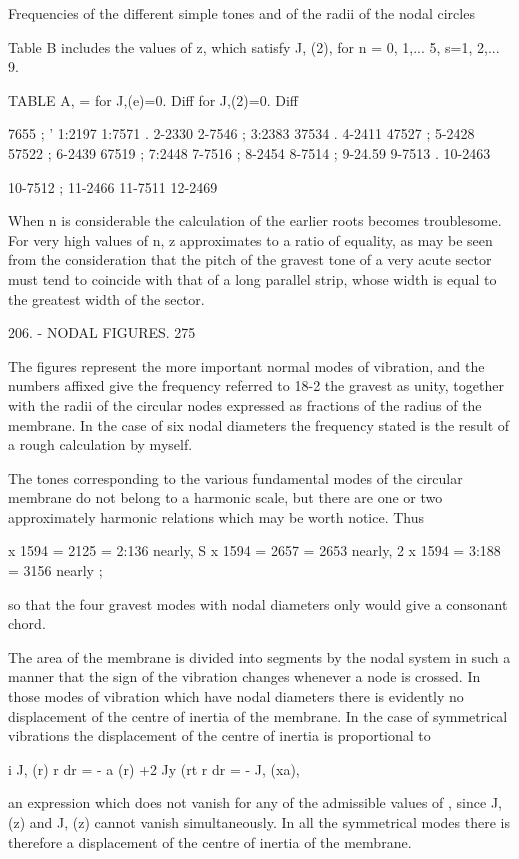 Frequencies of the different simple tones and of the radii of the nodal circles


Table B includes the values of z, which satisfy J, (2), for n =
0, 1,... 5, s=1, 2,... 9.


TABLE A, = for J,(e)=0. Diff for J,(2)=0. Diff

7655 ; ' 1:2197 1:7571 . 2-2330 2-7546 ; 3:2383 37534 . 4-2411 47527 ;
5-2428 57522 ; 6-2439 67519 ; 7:2448 7-7516 ; 8-2454 8-7514 ; 9-24.59
9-7513 . 10-2463

10-7512 ; 11-2466 11-7511 12-2469

When n is considerable the calculation of the earlier roots becomes
troublesome. For very high values of n, z approximates to a ratio of
equality, as may be seen from the consideration that the pitch of the
gravest tone of a very acute sector must tend to coincide with that of a
long parallel strip, whose width is equal to the greatest width of the sector.

206. - NODAL FIGURES. 275

The figures represent the more important normal modes of vibration, and
the numbers affixed give the frequency referred to 18-2
the gravest as unity, together with the radii of the circular nodes
expressed as fractions of the radius of the membrane. In the case of six
nodal diameters the frequency stated is the result of a rough
calculation by myself.

The tones corresponding to the various fundamental modes of the circular
membrane do not belong to a harmonic scale, but there are one or two
approximately harmonic relations which may be worth notice. Thus

x 1594 = 2125 = 2:136 nearly, S x 1594 = 2657 = 2653 nearly, 2 x
1594 = 3:188 = 3156 nearly ;

so that the four gravest modes with nodal diameters only would give a
consonant chord.

The area of the membrane is divided into segments by the nodal system in
such a manner that the sign of the vibration changes whenever a node is
crossed. In those modes of vibration which have nodal diameters there is
evidently no displacement of the centre of inertia of the membrane. In
the case of symmetrical vibrations the displacement of the centre of
inertia is proportional to

i J, (r) r dr = - a (r) +2 Jy (rt r dr = - J, (xa),

an expression which does not vanish for any of the admissible values of
, since J, (z) and J, (z) cannot vanish simultaneously. In all the
symmetrical modes there is therefore a displacement of the centre of
inertia of the membrane.


